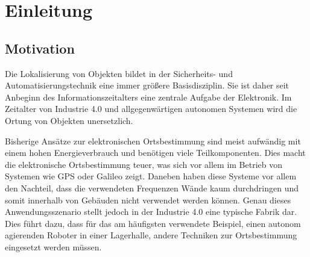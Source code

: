 
\chapter{Einleitung}
\label{sec:Einleitung}
\pagestyle{scrheadings}



\section{Motivation}
Die Lokalisierung von Objekten bildet in der Sicherheits- und Automatisierungstechnik eine immer größere Basisdisziplin. Sie ist daher seit Anbeginn des Informationszeitalters eine zentrale Aufgabe der Elektronik. Im Zeitalter von Industrie 4.0 und allgegenwärtigen autonomen Systemen wird die Ortung von Objekten unersetzlich.


Bisherige Ansätze zur elektronischen Ortsbestimmung sind meist aufwändig mit einem hohen Energieverbrauch und benötigen viele Teilkomponenten. Dies macht die elektronische Ortsbestimmung teuer, was sich vor allem im Betrieb von Systemen wie GPS oder Galileo zeigt. Daneben haben diese Systeme vor allem den Nachteil, dass die verwendeten Frequenzen Wände kaum durchdringen und somit innerhalb von Gebäuden nicht verwendet werden können. Genau dieses Anwendungsszenario stellt jedoch in der Industrie 4.0 eine typische Fabrik dar. Dies führt dazu, dass für das am häufigsten verwendete Beispiel, einen autonom agierenden Roboter in einer Lagerhalle, andere Techniken zur Ortsbestimmung eingesetzt werden müssen. 

